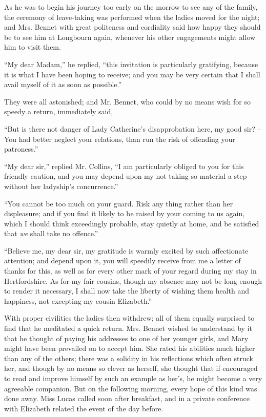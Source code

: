 As he was to begin his journey too early on the morrow
to see any of the family, the ceremony of leave-taking
was performed when the ladies moved for the night; and
Mrs. Bennet with great politeness and cordiality said how
happy they should be to see him at Longbourn again, whenever
his other engagements might allow him to visit them.

“My dear Madam,” he replied, “this invitation is
particularly gratifying, because it is what I have been
hoping to receive; and you may be very certain that I
shall avail myself of it as soon as possible.”

They were all astonished; and Mr. Bennet, who could
by no means wish for so speedy a return, immediately said,

“But is there not danger of Lady Catherine’s disapprobation
here, my good sir? -- You had better neglect your
relations, than run the risk of offending your patroness.”

“My dear sir,” replied Mr. Collins, “I am particularly
obliged to you for this friendly caution, and you may
depend upon my not taking so material a step without her
ladyship’s concurrence.”

“You cannot be too much on your guard. Risk
any thing rather than her displeasure; and if you find it
likely to be raised by your coming to us again, which I
should think exceedingly probable, stay quietly at home,
and be satisfied that \textit{we} shall take no offence.”

“Believe me, my dear sir, my gratitude is warmly
excited by such affectionate attention; and depend upon
it, you will speedily receive from me a letter of thanks for
this, as well as for every other mark of your regard during
my stay in Hertfordshire. As for my fair cousins, though
my absence may not be long enough to render it necessary,
I shall now take the liberty of wishing them health and
happiness, not excepting my cousin Elizabeth.”

With proper civilities the ladies then withdrew; all of
them equally surprised to find that he meditated a quick
return. Mrs. Bennet wished to understand by it that he
thought of paying his addresses to one of her younger
girls, and Mary might have been prevailed on to accept
him. She rated his abilities much higher than any of the
others; there was a solidity in his reflections which often
struck her, and though by no means so clever as herself,
she thought that if encouraged to read and improve himself
by such an example as her’s, he might become a very
agreeable companion. But on the following morning,
every hope of this kind was done away. Miss Lucas called
soon after breakfast, and in a private conference with
Elizabeth related the event of the day before.

